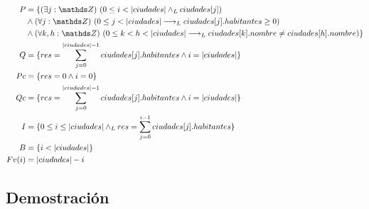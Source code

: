 \documentclass[50pt,a4paper]{article}
\begin{document}
\begin{align*}
    P &= \{ \existe[unalinea]{j}{\ent}{0 \leq i < |ciudades| \yLuego ciudades[j]}\\
    &\land \paraTodo[unalinea]{j}{\ent}{0 \leq j < |ciudades| \implicaLuego ciudades[j].habitantes \geq 0}\\
    &\land \paraTodo[unalinea]{k, h}{\ent}{0 \leq k < h < |ciudades| \implicaLuego ciudades[k].nombre \neq ciudades[h].nombre} \}\\
    Q &= \{ res = \sum\limits_{j=0}^{|ciudades| - 1} ciudades[j].habitantes \land i = |ciudades| \}\\
    Pc &= \{ res = 0 \land i = 0 \}\\
    Qc &= \{ res = \sum\limits_{j=0}^{|ciudades| - 1} ciudades[j].habitantes \land i = |ciudades| \}\\
    I &= \{ 0 \leq i \leq |ciudades| \yLuego res = \sum\limits_{j=0}^{i - 1} ciudades[j].habitantes \}\\
    B &= \{ i < |ciudades| \}\\
    Fv(i) &= |ciudades| - i
\end{align*}
\newpage
\subsection{Demostración}
\end{document}
